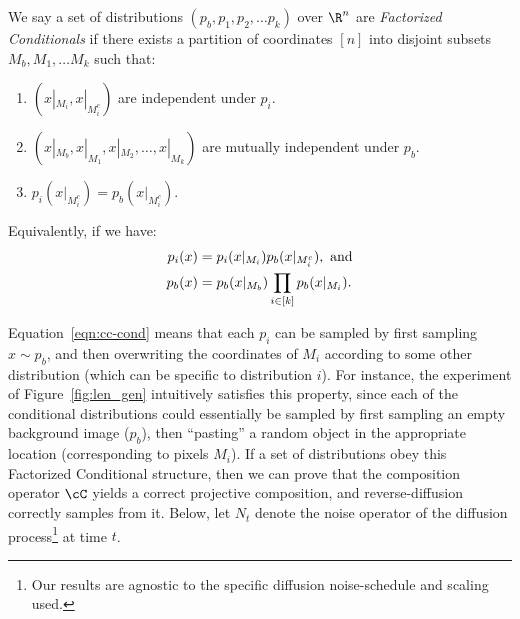 \begin{definition}
\label{def:factorized}

We say a set of distributions $(p_b, p_1, p_2, \dots p_k)$
over $\R^n$
are \emph{Factorized Conditionals} if
there exists a partition of coordinates $[n]$
into disjoint subsets $M_b, M_1, \dots M_k$ such that:
\begin{enumerate}
    \setlength{\itemsep}{1pt}
    \item $(x|_{M_i}, x|_{M_i^c})$ are independent under $p_i$.
    \item $(x|_{M_b}, x|_{M_1}, x|_{M_2}, \dots, x|_{M_k})$
    are mutually independent under $p_b$.
    \item $p_i(x|_{M_i^c}) = p_b(x|_{M_i^c})$.
\end{enumerate}

Equivalently, if we have:
\begin{align}
    p_i(x) &= p_i(x|_{M_i}) p_b(x|_{M_i^c}), \text{ and} \label{eqn:cc-cond}\\
    p_b(x) &= p_b(x|_{M_b}) \prod_{i \in [k]} p_b(x|_{M_i}). \notag
\end{align}
\end{definition}
\vspace{-1em}
Equation~\eqref{eqn:cc-cond} means that each $p_i$
can be sampled by first sampling $x \sim p_b$,
and then overwriting the coordinates of $M_i$
according to some other distribution (which can be specific to distribution $i$).
For instance, the experiment of Figure~\ref{fig:len_gen}
intuitively satisfies this property, since 
each of the conditional distributions could essentially be sampled
by first sampling an empty background image ($p_b$), then ``pasting''
a random object in the appropriate location (corresponding to pixels $M_i$).
If a set of distributions obey this Factorized Conditional structure,
then we can prove that the composition operator $\cC$
yields a correct projective composition,
and reverse-diffusion correctly samples from it.
Below, let $N_t$ denote the noise operator of the
diffusion process\footnote{Our results are agnostic to the specific diffusion noise-schedule and scaling used.} at time $t$.

